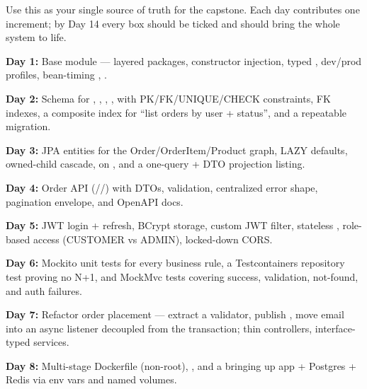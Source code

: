 Use this as your single source of truth for the capstone. Each day contributes one increment; by Day 14
every box should be ticked and  should bring the whole system to life.

\begin{checklist}
  \item \textbf{Day 1:} Base module --- layered packages, constructor injection, typed , dev/prod profiles, bean-timing , .
  \item \textbf{Day 2:} Schema for , , , ,  with PK/FK/UNIQUE/CHECK constraints, FK indexes, a composite index for ``list orders by user + status'', and a repeatable migration.
  \item \textbf{Day 3:} JPA entities for the Order/OrderItem/Product graph, LAZY defaults, owned-child cascade,  on , and a one-query  + DTO projection listing.
\end{checklist}

\begin{checklist}
  \item \textbf{Day 4:} Order API (//) with DTOs, validation, centralized error shape, pagination envelope, and OpenAPI docs.
  \item \textbf{Day 5:} JWT login + refresh, BCrypt storage, custom JWT filter, stateless , role-based access (CUSTOMER vs ADMIN), locked-down CORS.
  \item \textbf{Day 6:} Mockito unit tests for every business rule, a Testcontainers repository test proving no N+1, and MockMvc tests covering success, validation, not-found, and auth failures.
\end{checklist}

\begin{checklist}
  \item \textbf{Day 7:} Refactor order placement --- extract a validator, publish , move email into an async listener decoupled from the transaction; thin controllers, interface-typed services.
  \item \textbf{Day 8:} Multi-stage Dockerfile (non-root), , and a  bringing up app + Postgres + Redis via env vars and named volumes.
\end{checklist}

